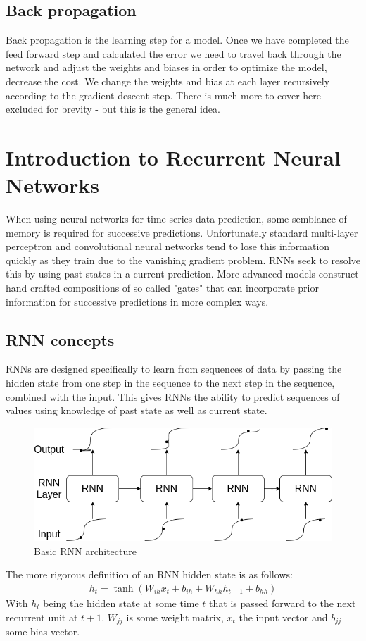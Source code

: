 \documentclass{article}
\begin{document}
\subsection{Back propagation}
\label{sec:back}
Back propagation is the learning step for a model. Once we have completed the feed forward step and calculated the error we need to travel back through the network and adjust the weights and biases in order to optimize the model, decrease the cost. We change the weights and bias at each layer recursively according to the gradient descent step.  There is much more to cover here - excluded for brevity - but this is the general idea. 
\section{Introduction to Recurrent Neural Networks}
\label{sec:intoRNNs}
When using neural networks for time series data prediction, some semblance of memory is required for successive predictions. Unfortunately standard multi-layer perceptron and convolutional neural networks tend to lose this information quickly as they train due to the vanishing gradient problem. RNNs seek to resolve this by using past states in a current prediction. More advanced models construct hand crafted compositions of so called "gates" that can incorporate prior information for successive predictions in more complex ways. 

\subsection{RNN concepts}
\label{sec:RNNS}
RNNs are designed specifically to learn from sequences of data by passing the hidden state from one step in the sequence to the next step in the sequence, combined with the input. This gives RNNs the ability to predict sequences of values using knowledge of past state as well as current state. 
\begin{figure}[H]
\centering
\caption{Basic RNN architecture}
\label{fig:RNN}
\includegraphics[scale=0.5]{RNN.png}
\end{figure}
The more rigorous definition of an RNN hidden state is as follows:
\begin{align*}
h_t = \tanh\left( W_{ih}x_t + b_{ih} + W_{hh}h_{t-1} + b_{hh}  \right)
\end{align*}
With $h_t$ being the hidden state at some time $t$ that is passed forward to the next recurrent unit at $t+1$. $W_{jj}$ is some weight matrix, $x_t$ the input vector and $b_{jj}$ some bias vector. \\
\end{document}
